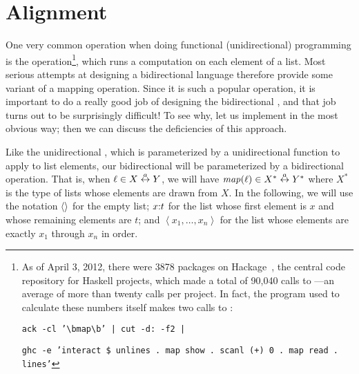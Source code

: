 \section{Alignment}
\label{sec:intro-alignment}
One very common operation when doing functional (unidirectional) programming
is the \map operation\footnote{As of April 3, 2012, there were 3878 packages
on Hackage~\cite{Hackage2012}, the central code repository for Haskell
projects, which made a total of 90,040 calls to \map---an average of more
than twenty calls per project. In fact, the program used to calculate these
numbers itself makes two calls to \map:

\noindent\texttt{ack -cl '\textbackslash bmap\textbackslash b' | cut -d: -f2 |}

\noindent\texttt{ghc -e 'interact \$ unlines . map show . scanl (+) 0 . map read . lines'}
}, which runs a computation on each element of a list. Most serious attempts
at designing a bidirectional language therefore provide some variant of a
mapping operation. Since it is such a popular operation, it is important to
do a really good job of designing the bidirectional \map, and that job turns
out to be surprisingly difficult! To see why, let us implement \map in the
most obvious way; then we can discuss the deficiencies of this approach.

Like the unidirectional \map, which is parameterized by a unidirectional
function to apply to list elements, our bidirectional \map will be
parameterized by a bidirectional operation. That is, when $\ell \in X \overset{a}{\leftrightarrow}
Y$, we will have $\mathit{map}(\ell) \in X^* \overset{a}{\leftrightarrow} Y^*$ where $X^*$ is the type of
lists whose elements are drawn from $X$. In the following, we will use the
notation $\left<\right>$ for the empty list; $x \mathord{:} t$ for the list whose first
element is $x$ and whose remaining elements are $t$; and
$\left<x_1,\ldots,x_n\right>$ for the list whose elements are exactly $x_1$
through $x_n$ in order.

